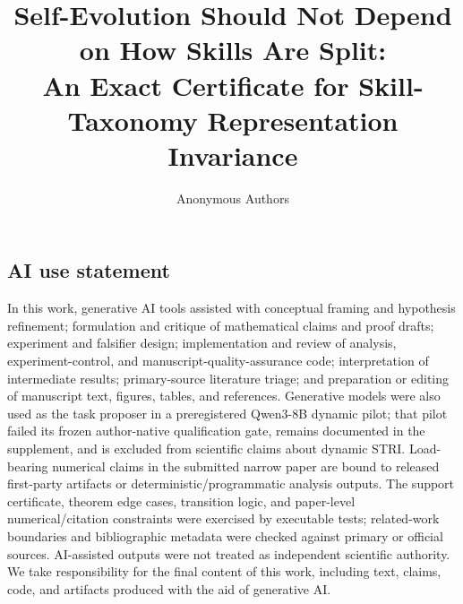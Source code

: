 \documentclass{article}
\title{Self-Evolution Should Not Depend on How Skills Are Split:\\An Exact Certificate for Skill-Taxonomy Representation Invariance}
\author{Anonymous Authors}
\begin{document}
\maketitle



\clearpage
\label{stri:post-main-page}

\subsection*{AI use statement}
In this work, generative AI tools assisted with conceptual framing and hypothesis refinement; formulation and critique of mathematical claims and proof drafts; experiment and falsifier design; implementation and review of analysis, experiment-control, and manuscript-quality-assurance code; interpretation of intermediate results; primary-source literature triage; and preparation or editing of manuscript text, figures, tables, and references. Generative models were also used as the task proposer in a preregistered Qwen3-8B dynamic pilot; that pilot failed its frozen author-native qualification gate, remains documented in the supplement, and is excluded from scientific claims about dynamic STRI. Load-bearing numerical claims in the submitted narrow paper are bound to released first-party artifacts or deterministic/programmatic analysis outputs. The support certificate, theorem edge cases, transition logic, and paper-level numerical/citation constraints were exercised by executable tests; related-work boundaries and bibliographic metadata were checked against primary or official sources. AI-assisted outputs were not treated as independent scientific authority. We take responsibility for the final content of this work, including text, claims, code, and artifacts produced with the aid of generative AI.
\end{document}
